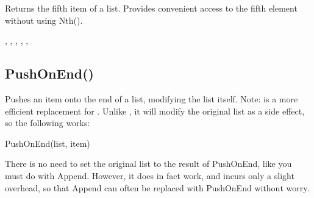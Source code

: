 \documentclass[letterpaper,10pt,english]{sphinxmanual}
\begin{document}
\sphinxAtStartPar
{}

\sphinxAtStartPar
Returns the fifth item of a list. Provides convenient access to the fifth element without using Nth().

\sphinxAtStartPar
{}

\begin{sphinxVerbatim}[commandchars=\\\{\}]
\end{sphinxVerbatim}

\sphinxAtStartPar
{}

\begin{sphinxVerbatim}[commandchars=\\\{\}]
\PYG{p}{[}\PYG{p}{]}
\end{sphinxVerbatim}

\sphinxAtStartPar
{}

\sphinxAtStartPar
{}, , , , , 

\ignorespaces 

\subsection{PushOnEnd()}
\label{\detokenize{reference/pebllist:pushonend}}\label{\detokenize{reference/pebllist:index-16}}
\sphinxAtStartPar
{}

\sphinxAtStartPar
Pushes an item onto the end of a list, modifying the list itself.  Note:  is a more efficient replacement for . Unlike , it will modify the original list as a side effect, so the following works:

\begin{sphinxVerbatim}[commandchars=\\\{\}]
  PushOnEnd(list, item)

There is no need to set the original list to the result of PushOnEnd, like you must do with Append.  However, it does in fact work, and incurs only a slight overhead, so that Append can often be replaced with PushOnEnd without worry.
\end{sphinxVerbatim}
\end{document}
